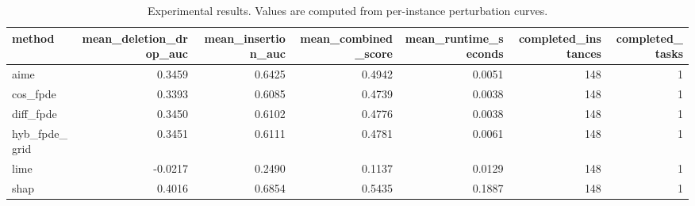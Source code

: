 \begin{table}[t]
\caption{Experimental results. Values are computed from per-instance perturbation curves.}
\label{tab:main_results_computed}
\centering
\begin{tabular}{lrrrrrr}
\toprule
method & mean\_deletion\_drop\_auc & mean\_insertion\_auc & mean\_combined\_score & mean\_runtime\_seconds & completed\_instances & completed\_tasks \\
\midrule
aime & 0.3459 & 0.6425 & 0.4942 & 0.0051 & 148 & 1 \\
cos\_fpde & 0.3393 & 0.6085 & 0.4739 & 0.0038 & 148 & 1 \\
diff\_fpde & 0.3450 & 0.6102 & 0.4776 & 0.0038 & 148 & 1 \\
hyb\_fpde\_grid & 0.3451 & 0.6111 & 0.4781 & 0.0061 & 148 & 1 \\
lime & -0.0217 & 0.2490 & 0.1137 & 0.0129 & 148 & 1 \\
shap & 0.4016 & 0.6854 & 0.5435 & 0.1887 & 148 & 1 \\
\bottomrule
\end{tabular}

\end{table}
